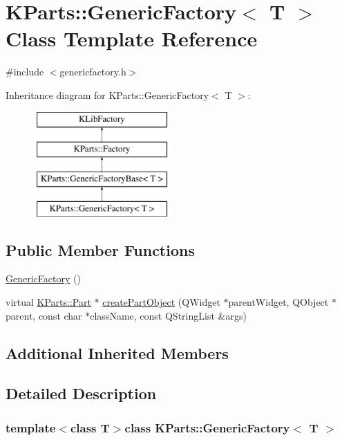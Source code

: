 \hypertarget{classKParts_1_1GenericFactory}{\section{K\+Parts\+:\+:Generic\+Factory$<$ T $>$ Class Template Reference}
\label{classKParts_1_1GenericFactory}
}


{\ttfamily \#include $<$genericfactory.\+h$>$}

Inheritance diagram for K\+Parts\+:\+:Generic\+Factory$<$ T $>$\+:\begin{figure}[H]
\begin{center}
\leavevmode
\includegraphics[height=4.000000cm]{classKParts_1_1GenericFactory}
\end{center}
\end{figure}
\subsection*{Public Member Functions}
\begin{DoxyCompactItemize}
\item 
\hyperlink{classKParts_1_1GenericFactory_aef00baf603a775a324f84fb30ba5a0f4}{Generic\+Factory} ()
\item 
virtual \hyperlink{classKParts_1_1Part}{K\+Parts\+::\+Part} $\ast$ \hyperlink{classKParts_1_1GenericFactory_ac80d722fb2433018dfea04f0f6b89f74}{create\+Part\+Object} (Q\+Widget $\ast$parent\+Widget, Q\+Object $\ast$parent, const char $\ast$class\+Name, const Q\+String\+List \&args)
\end{DoxyCompactItemize}
\subsection*{Additional Inherited Members}


\subsection{Detailed Description}
\subsubsection*{template$<$class T$>$class K\+Parts\+::\+Generic\+Factory$<$ T $>$}

